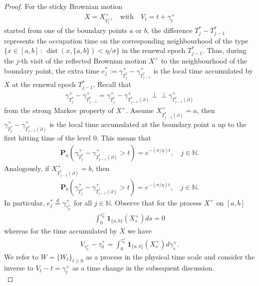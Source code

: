 \documentclass[10pt,a4paper]{article}
\numberwithin{equation}{section}
\newcommand{\indep}{\perp \! \! \! \perp}
\theoremstyle{plain}
\theoremstyle{remark}
\begin{document}
\begin{proof}
For the sticky Brownian motion 
\begin{align*}
X=X^+_{V^{-1}_t} \quad \textrm{with} \quad V_t = t + \gamma^+_t
\end{align*}
started from one of the boundary points $a$ or $b$, the difference $T^*_j- T^*_{j-1}$ represents the occupation time on the corresponding neighbourhood of the type $\{x \in [a,b]\,:\, \operatorname{dist}(x, \{a,b\}) < \eta/\sigma\}$ in the renewal epoch $T^*_{j-1}$. Thus, during the $j$-th visit of the reflected Brownian motion $X^+$ to the neighbourhood of the boundary point,  the extra time $e^*_j:= \gamma^+_{T^*_j} - \gamma^+_{T^*_{j-1}}$ is the local time accumulated by $X$ at the renewal epoch $T^*_{j-1}$. Recall that
\begin{align*}
\gamma^+_{T^*_j} - \gamma^+_{T^*_{j-1}} = \gamma^+_{T^*_j} - \gamma^+_{T^*_{j-1}(\partial)} \indep  \gamma^+_{T^*_{j-1}(\partial)}
\end{align*}
from the strong Markov property of $X^+$. Assume $X^+_{T^*_{j-1}(\partial)} =a$, then $\gamma^+_{T^*_j} - \gamma^+_{T^*_{j-1}(\partial)}$ is the local time accumulated at the boundary point $a$ up to the first hitting time of the level $0$. This means that 
\begin{align*}
\mathbf{P}_a(\gamma^+_{T^*_j} - \gamma^+_{T^*_{j-1}(\partial)} > t ) = e^{-(\sigma/\eta) t}, \quad j \in \mathbb{N}.
\end{align*}
Analogously, if $X^+_{T^*_{j-1}(\partial)}=b$, then
\begin{align*}
\mathbf{P}_b(\gamma^+_{T^*_j} - \gamma^+_{T^*_{j-1}(\partial)} > t ) = e^{-(\sigma/\eta) t}, \quad j \in \mathbb{N}.
\end{align*}
In particular, $e^*_j \stackrel{d}{=} \gamma^+_{\tau^+_0}$ for all $j \in \mathbb{N}$. Observe that for the process $X^+$ on $[a,b]$  
\begin{align*}
\int_0^{\tau^+_0} \mathbf{1}_{\{a, b\}}(X^+_s)ds =0 
\end{align*}
whereas for the time accumulated by $X$ we have
\begin{align*}
V_{\tau^+_0} - \tau^+_0 = \int_0^{\tau^+_0} \mathbf{1}_{\{a, b\}}(X^+_s) d\gamma^+_s.
\end{align*}
We refer to $W=\{W_t\}_{t\geq 0}$ as a process in the physical time scale and consider the inverse to $V_t - t = \gamma^+_t$ as a time change in the subsequent discussion. \\


\end{proof}
\end{document}
